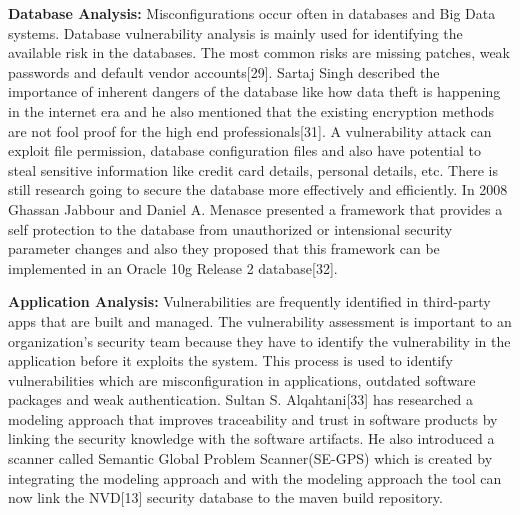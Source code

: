{\bf Database Analysis:} Misconfigurations occur often in databases and Big Data systems. Database vulnerability analysis is mainly used for identifying the available risk in the databases. The most common risks are missing patches, weak passwords and default vendor accounts[29]. Sartaj Singh described the importance of inherent dangers of the database like how data theft is happening in the internet era and he also mentioned that the existing encryption methods are not fool proof for the high end professionals[31]. A vulnerability attack can exploit file permission, database configuration files and also have potential to steal sensitive information like credit card details, personal details, etc. There is still research going to secure the database more effectively and efficiently. In 2008 Ghassan Jabbour and Daniel A. Menasce presented a framework that provides a self protection to the database from unauthorized or intensional security parameter changes and also they proposed that this framework can be implemented in an Oracle 10g Release 2 database[32].

{\bf Application Analysis:} Vulnerabilities are frequently identified in third-party apps that are built and managed. The vulnerability assessment is important to an organization’s security team because they have to identify the vulnerability in the application before it exploits the system. This process is used to identify vulnerabilities which are misconfiguration in applications, outdated software packages and weak authentication. Sultan S. Alqahtani[33] has researched a modeling approach that improves traceability and trust in software products by linking the security knowledge with the software artifacts. He also introduced a scanner called  Semantic Global Problem Scanner(SE-GPS) which is created by integrating the modeling approach and with the modeling approach the tool can now link the NVD[13] security database to the maven build repository. 
